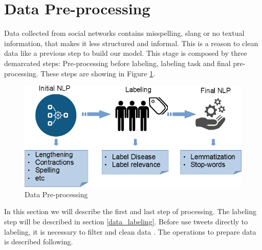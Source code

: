 \documentclass[12pt]{report}
\begin{document}
\section{Data Pre-processing} \label{data_preprocessing}

Data collected from social networks contains misspelling, slang or no textual information, that makes it less structured and informal. This is a reason to clean data like a previous step to build our model. This stage is composed by three demarcated steps: Pre-processing before labeling, labeling task and final pre-processing. These steps are showing in Figure \ref{figure:data_preprocessing}. 

\begin{figure}[H]	
	\centering
	\includegraphics[width=150mm, scale = 0.8]{images/9_data_preprocessing.png}	
	\caption{Data Pre-processing}	
	\label{figure:data_preprocessing}
\end{figure}

In this section we will describe the first and last step of processing. The labeling step will be described in section \ref{data_labeling}. Before use tweets directly to labeling, it is necessary to filter and clean data \cite{Dai2017} \cite{Ahuja2017} \cite{Halibas2018}. The operations to prepare data is described following.
\end{document}

